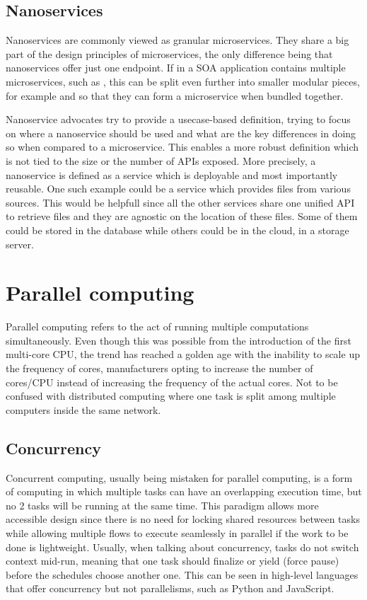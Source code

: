 \subsection{Nanoservices}

Nanoservices are commonly viewed as granular microservices. They share a big part of the design principles of microservices, the only difference being that nanoservices offer just one endpoint. If in a  SOA application contains multiple microservices, such as , this can be split even further into smaller modular pieces, for example  and  so that they can form a microservice when bundled together.

Nanoservice advocates try to provide a usecase-based definition, trying to focus on where a nanoservice should be used and what are the key differences in doing so when compared to a microservice. This enables a more robust definition which is not tied to the size or the number of APIs exposed. More precisely, a nanoservice is defined as a service which is deployable and most importantly reusable. One such example could be a service which provides files from various sources. This would be helpfull since all the other services share one unified API to retrieve files and they are agnostic on the location of these files. Some of them could be stored in the database while others could be in the cloud, in a storage server.

\section{Parallel computing}
Parallel computing refers to the act of running multiple computations simultaneously. Even though this was possible from the introduction of the first multi-core CPU, the trend has reached a golden age with the inability to scale up the frequency of cores, manufacturers opting to increase the number of cores/CPU instead of increasing the frequency of the actual cores. Not to be confused with distributed computing where one task is split among multiple computers inside the same network.

\subsection{Concurrency}
Concurrent computing, usually being mistaken for parallel computing, is a form of computing in which multiple tasks can have an overlapping execution time, but no 2 tasks will be running at the same time. This paradigm allows more accessible design since there is no need for locking shared resources between tasks while allowing multiple flows to execute seamlessly in parallel if the work to be done is lightweight. Usually, when talking about concurrency, tasks do not switch context mid-run, meaning that one task should finalize or yield (force pause) before the schedules choose another one. This can be seen in high-level languages that offer concurrency but not parallelisms, such as Python and JavaScript.


